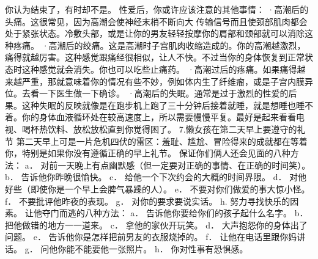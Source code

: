 \documentclass[12pt,UTF8]{ctexbook}
\begin{document}
你认为结束了，有时却不是。
性爱后，你或许应该注意的其他事情：
·高潮后的头痛。这很常见，因为高潮会使神经末梢不断向大
传输信号而且使颈部肌肉都会处于紧张状态。冷敷头部，或是让你的男友轻轻按摩你的肩部和颈部就可以消除这种疼痛。
·高潮后的绞痛。这是高潮时子宫肌肉收缩造成的。你的高潮越激烈，痛得就越厉害。这种感觉跟痛经很相似，让人不快。不过当你的身体恢复到正常状态时这种感觉就会消失。你也可以吃些止痛药。
·高潮过后的疼痛。如果痛得越来越严重，那就意味着你的情况有些不妙，例如体内生了纤维瘤，或是子宫内膜异位。去看一下医生做一下确诊。
·高潮后的失眠。通常是过于激烈的性爱的后果。这种失眠的反映就像是在跑步机上跑了三十分钟后接着就睡，就是想睡也睡不着。你的身体血液循环处在较高速度上，所以需要慢慢平复。最好是起来看看电视、喝杯热饮料、放松放松直到你觉得困了。
7.懒女孩在第二天早上要遵守的礼节
第二天早上可是一片危机四伏的雷区：羞耻、尴尬、冒险得来的成就都在等着你，特别是如果你没有遵循正确的早上礼节。
保证你们俩人还会见面的八种方法：
a． 对前一天晚上有点幽默感（但一定要对正确的事情、在正确的时间笑）。
b． 告诉他你昨晚很愉快。
c． 给他一个下次约会的大概的时间界限。
d． 对他好些（即使你是一个早上会脾气暴躁的人）。
e． 不要对你们做爱的事大惊小怪。
f． 不要批评他昨夜的表现。
g． 对你的要求要说实话。
h. 努力寻找快乐的因素。
让他夺门而逃的八种方法：
a． 告诉他你要给你们的孩子起什么名字。
b． 把他做错的地方一一道来。
c． 拿他的家伙开玩笑。
d． 大声抱怨你的身体出了问题。
e． 告诉他你是怎样把前男友的衣服烧掉的。
f． 让他在电话里跟你妈讲话。
g． 问他你能不能要他一张照片。
h． 你对性事有恐惧感。
\end{document}
